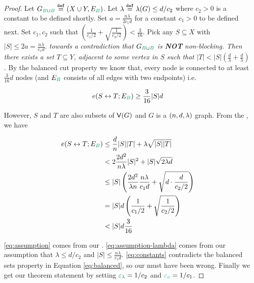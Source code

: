 \documentclass[11pt]{article}
\begin{document}
\begin{proof}
Let $\BipartiteG \Def (X \cup Y, E_{\GreenB})$. 
Let $\lambda \text{}\overset{\mathtt{def}}{=} \lambda(G) \leq d/c_2$ where $c_2 > 0$ is a constant to be defined shortly.
Set $a = \frac{n\lambda}{2c_1 d}$ for a constant $c_1 > 0$ to be defined next.
Set $c_1, c_2$ such that $\left(\frac{1}{c_1/2}  + \sqrt{\frac{1}{c_2/2}}\right) < \frac{3}{16}$.
Pick any $S \subseteq X$ with $|S| \leq 2a = \frac{n\lambda}{c_1 d}$.
\emph{ towards a contradiction that $\BipartiteG$ is \textbf{NOT} non-blocking.
  Then there exists a set $T \subseteq Y$, adjacent to some vertex in $S$ such that $|T| < |S|(\frac{d}{\lambda}+\frac{d}{\lambda})$.} 
By the balanced cut property we know that, every  node is connected to at least $\frac{3}{16}d$  nodes (and $E_{\GreenB}$ consists of all edges with two  endpoints) i.e.

\begin{equation}\label{eq:balanced}
  \CutEdges{S}{T}{E_{\GreenB}} \geq \frac{3}{16}|S|d
\end{equation}

However, $S$ and $T$ are also subsets of $\mathsf{V}(G)$ and $G$ is a $(n, d, \lambda)$ graph.
From the , we have

\begin{align}
	\CutEdges{S}{T}{E_{\GreenB}} &\leq \frac{d}{n}|S||T| + \lambda\sqrt{|S||T|} \\
	&< 2\frac{2d^2}{n\lambda}|S|^2 + |S|\sqrt{2\lambda d} \label{eq:assumption}\\
	&\leq |S|\left(\frac{2d^2}{\lambda n} \frac{n\lambda}{c_1 d} + \sqrt{d\cdot \frac{d}{c_2/2}}\right) \label{eq:assumption-lambda}\\
	&= |S|d\left(\frac{1}{c_1/2}  + \sqrt{\frac{1}{c_2/2}}\right) \\
	&< |S|d\frac{3}{16} \label{eq:constants}
\end{align}

\eqref{eq:assumption} comes from our .
\eqref{eq:assumption-lambda} comes from our assumption that $\lambda \leq d/c_2$ and $|S| \leq \frac{n\lambda}{c_1 d}$.
\eqref{eq:constants} contradicts the balanced sets property in Equation \eqref{eq:balanced}, so our  must have been wrong.
Finally we get our theorem statement by setting $\epsilonL = 1/c_2$ and $\epsilonA = 1/c_1$.

\end{proof}
\end{document}
